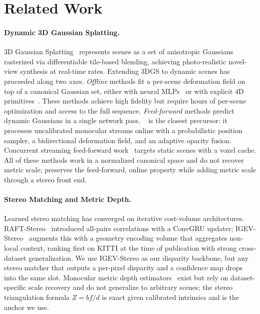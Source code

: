 \section{Related Work}
\label{sec:related}

\paragraph{Dynamic 3D Gaussian Splatting.}
3D Gaussian Splatting~\cite{kerbl2023gaussian} represents scenes as a set
of anisotropic Gaussians rasterized via differentiable tile-based
blending, achieving photo-realistic novel-view synthesis at real-time
rates. Extending 3DGS to dynamic scenes has proceeded along two axes.
\emph{Offline} methods fit a per-scene deformation field on top of a
canonical Gaussian set, either with neural
MLPs~\cite{luiten2024dynamic,duan2024gaussian, Yang2024Deformable3G} or
with explicit 4D primitives~\cite{wu2024gaussian}. These methods achieve
high fidelity but require hours of per-scene optimization and access to
the full sequence. \emph{Feed-forward} methods predict dynamic Gaussians
in a single network pass. \StreamSplat~\cite{wu2026streamsplat} is the
closest precursor: it processes uncalibrated monocular streams online
with a probabilistic position sampler, a bidirectional deformation field,
and an adaptive opacity fusion. Concurrent streaming feed-forward
work~\cite{song2026streaming} targets static scenes with a voxel cache.
All of these methods work in a normalized canonical space and do not
recover metric scale; \StereoSplat preserves the feed-forward, online
property while adding metric scale through a stereo front end.

\paragraph{Stereo Matching and Metric Depth.}
Learned stereo matching has converged on iterative cost-volume
architectures. RAFT-Stereo~\cite{lipson2021raft} introduced all-pairs
correlations with a ConvGRU updater; IGEV-Stereo~\cite{xu2023igev}
augments this with a geometry encoding volume that aggregates non-local
context, ranking first on KITTI at the time of publication with strong
cross-dataset generalization. We use IGEV-Stereo as our disparity
backbone, but any stereo matcher that outputs a per-pixel disparity and a
confidence map drops into the same slot. Monocular metric depth
estimators~\cite{yang2024depth} exist but rely on dataset-specific scale
recovery and do not generalize to arbitrary scenes; the stereo triangulation
formula $Z = b f / d$ is exact given calibrated intrinsics and is the
anchor we use.


